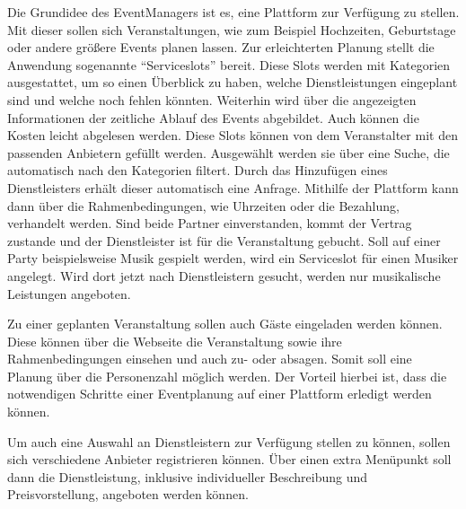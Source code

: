 

Die Grundidee des EventManagers ist es, eine Plattform zur Verfügung zu stellen. Mit dieser sollen sich Veranstaltungen, wie zum Beispiel Hochzeiten, Geburtstage oder andere größere Events planen lassen. Zur erleichterten Planung stellt die Anwendung sogenannte \enquote{Serviceslots} bereit. Diese Slots werden mit Kategorien ausgestattet, um so einen Überblick zu haben, welche Dienstleistungen eingeplant sind und welche noch fehlen könnten. Weiterhin wird über die angezeigten Informationen der zeitliche Ablauf des Events abgebildet. Auch können die Kosten leicht abgelesen werden. Diese Slots können von dem Veranstalter mit den passenden Anbietern gefüllt werden. Ausgewählt werden sie über eine Suche, die automatisch nach den Kategorien filtert. Durch das Hinzufügen eines Dienstleisters erhält dieser automatisch eine Anfrage. Mithilfe der Plattform kann dann über die Rahmenbedingungen, wie Uhrzeiten oder die Bezahlung, verhandelt werden. Sind beide Partner einverstanden, kommt der Vertrag zustande und der Dienstleister ist für die Veranstaltung gebucht. Soll auf einer Party beispielsweise Musik gespielt werden, wird ein Serviceslot für einen Musiker angelegt. Wird dort jetzt nach Dienstleistern gesucht, werden nur musikalische Leistungen angeboten.

Zu einer geplanten Veranstaltung sollen auch Gäste eingeladen werden können. Diese können über die Webseite die Veranstaltung sowie ihre Rahmenbedingungen einsehen und auch zu- oder absagen. Somit soll eine Planung über die Personenzahl möglich werden. Der Vorteil hierbei ist, dass die notwendigen Schritte einer Eventplanung auf einer Plattform erledigt werden können.

Um auch eine Auswahl an Dienstleistern zur Verfügung stellen zu können, sollen sich verschiedene Anbieter registrieren können. Über einen extra Menüpunkt soll dann die Dienstleistung, inklusive individueller Beschreibung und Preisvorstellung, angeboten werden können.
